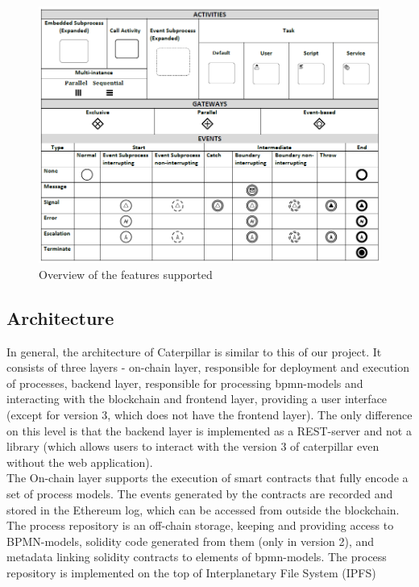\begin{figure}[hbt]
	\includegraphics[width=\textwidth]{gfx/caterpillar-bpmn}
	\caption{Overview of the features supported}
	\label{fig:caterpillar:overview:bpmn}
\end{figure}

\subsection{Architecture}
\label{sec:caterpillar:overview:architecture}

In general, the architecture of Caterpillar is similar to this of our project. It consists of three layers - on-chain layer, responsible for deployment and execution of processes, backend layer, responsible for processing bpmn-models and interacting with the blockchain and frontend layer, providing a user interface (except for version 3, which does not have the frontend layer). The only difference on this level is that the backend layer is implemented as a REST-server and not a library (which allows users to interact with the version 3 of caterpillar even without the web application).\\

The On-chain layer supports the execution of smart contracts that fully encode a set of process models. The events generated by the contracts are recorded and stored in the Ethereum log, which can be accessed from outside the blockchain. The process repository is an off-chain storage, keeping and providing access to BPMN-models, solidity code generated from them (only in version 2), and metadata linking solidity contracts to elements of bpmn-models. The process repository is implemented on the top of Interplanetary File System (IPFS)\\

